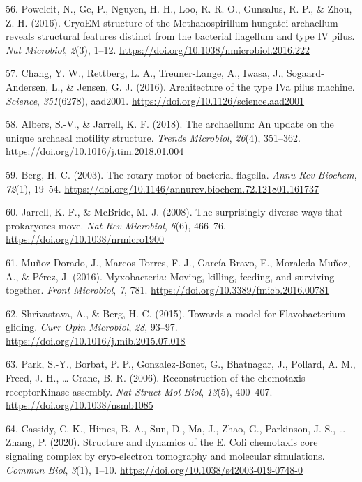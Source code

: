 \documentclass[]{tufte-book}
\begin{document}
\leavevmode\hypertarget{ref-poweleit2016}{}%
56. Poweleit, N., Ge, P., Nguyen, H. H., Loo, R. R. O., Gunsalus, R. P., \& Zhou, Z. H. (2016). CryoEM structure of the Methanospirillum hungatei archaellum reveals structural features distinct from the bacterial flagellum and type IV pilus. \emph{Nat Microbiol}, \emph{2}(3), 1--12. \url{https://doi.org/10.1038/nmicrobiol.2016.222}

\leavevmode\hypertarget{ref-chang2016}{}%
57. Chang, Y. W., Rettberg, L. A., Treuner-Lange, A., Iwasa, J., Sogaard-Andersen, L., \& Jensen, G. J. (2016). Architecture of the type IVa pilus machine. \emph{Science}, \emph{351}(6278), aad2001. \url{https://doi.org/10.1126/science.aad2001}

\leavevmode\hypertarget{ref-albers2018}{}%
58. Albers, S.-V., \& Jarrell, K. F. (2018). The archaellum: An update on the unique archaeal motility structure. \emph{Trends Microbiol}, \emph{26}(4), 351--362. \url{https://doi.org/10.1016/j.tim.2018.01.004}

\leavevmode\hypertarget{ref-berg2003}{}%
59. Berg, H. C. (2003). The rotary motor of bacterial flagella. \emph{Annu Rev Biochem}, \emph{72}(1), 19--54. \url{https://doi.org/10.1146/annurev.biochem.72.121801.161737}

\leavevmode\hypertarget{ref-jarrell2008}{}%
60. Jarrell, K. F., \& McBride, M. J. (2008). The surprisingly diverse ways that prokaryotes move. \emph{Nat Rev Microbiol}, \emph{6}(6), 466--76. \url{https://doi.org/10.1038/nrmicro1900}

\leavevmode\hypertarget{ref-munoz-dorado2016}{}%
61. Muñoz-Dorado, J., Marcos-Torres, F. J., García-Bravo, E., Moraleda-Muñoz, A., \& Pérez, J. (2016). Myxobacteria: Moving, killing, feeding, and surviving together. \emph{Front Microbiol}, \emph{7}, 781. \url{https://doi.org/10.3389/fmicb.2016.00781}

\leavevmode\hypertarget{ref-shrivastava2015}{}%
62. Shrivastava, A., \& Berg, H. C. (2015). Towards a model for Flavobacterium gliding. \emph{Curr Opin Microbiol}, \emph{28}, 93--97. \url{https://doi.org/10.1016/j.mib.2015.07.018}

\leavevmode\hypertarget{ref-park2006}{}%
63. Park, S.-Y., Borbat, P. P., Gonzalez-Bonet, G., Bhatnagar, J., Pollard, A. M., Freed, J. H., \ldots{} Crane, B. R. (2006). Reconstruction of the chemotaxis receptorKinase assembly. \emph{Nat Struct Mol Biol}, \emph{13}(5), 400--407. \url{https://doi.org/10.1038/nsmb1085}

\leavevmode\hypertarget{ref-cassidy2020}{}%
64. Cassidy, C. K., Himes, B. A., Sun, D., Ma, J., Zhao, G., Parkinson, J. S., \ldots{} Zhang, P. (2020). Structure and dynamics of the E. Coli chemotaxis core signaling complex by cryo-electron tomography and molecular simulations. \emph{Commun Biol}, \emph{3}(1), 1--10. \url{https://doi.org/10.1038/s42003-019-0748-0}
\end{document}
